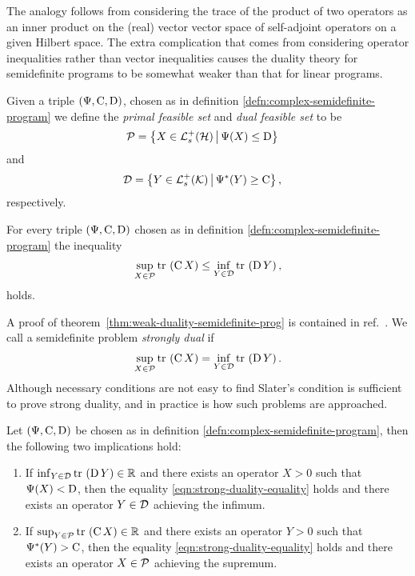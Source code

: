 The analogy follows from considering the trace of the product of two operators as an inner product on the (real) vector vector space of self-adjoint operators on a given Hilbert space. The extra complication that comes from considering operator inequalities rather than vector inequalities causes the duality theory for semidefinite programs to be somewhat weaker than that for linear programs.

\begin{defn}\label{defn:semidefinite-feasible-sets}
  Given a triple $\left(\Psi, \operatorname{C}, \operatorname{D}\right)$, chosen as in definition \ref{defn:complex-semidefinite-program} we define the \emph{primal feasible set} and \emph{dual feasible set} to be
  \begin{align}
    \pcal &= \sbuild{X\in\posops[\hcal]}{\Psi(X)\leq \opd}
  \end{align}
  and
  \begin{align}
    \dcal &= \sbuild{Y\in\posops[\kcal]}{\Psi^*(Y)\geq \opc},
  \end{align}
  respectively.
\end{defn}

\begin{thm}\label{thm:weak-duality-semidefinite-prog}
  For every triple $\left(\Psi, \operatorname{C}, \operatorname{D}\right)$ chosen as in definition \ref{defn:complex-semidefinite-program} the inequality
  \begin{align}
    \sup_{X\in\pcal} \tr{\opc X} \leq \inf_{Y\in\dcal} \tr{\opd Y},
  \end{align}
  holds.
\end{thm}
A proof of theorem~\ref{thm:weak-duality-semidefinite-prog} is contained in ref.~\cite{Vandenberghe-Boyd-semidefinite}.
We call a semidefinite problem \emph{strongly dual} if
\begin{align}\label{eqn:strong-duality-equality}
  \sup_{X\in\pcal} \tr{\opc X} = \inf_{Y\in\dcal} \tr{\opd Y}.
\end{align}
Although necessary conditions are not easy to find Slater's condition \cite{slater1950} is sufficient to prove strong duality, and in practice is how such problems are approached.
\begin{thm}\label{eqn:slaters-condition-sufficient}
  Let $\left(\Psi, \operatorname{C}, \operatorname{D}\right)$ be chosen as in definition \ref{defn:complex-semidefinite-program}, then the following two implications hold:
  \begin{enumerate}
  \item If $\inf_{Y\in\dcal} \tr{\opd Y} \in\R$ and there exists an operator $X> 0$ such that $\Psi(X) < \operatorname{D}$, then the equality \eqref{eqn:strong-duality-equality} holds and there exists an operator $Y\in\mathcal{D}$ achieving the infimum.
  \item If $\sup_{Y\in\pcal} \tr{\opc X} \in\R$ and there exists an operator $Y> 0$ such that $\Psi^*(Y) > \operatorname{C}$, then the equality \eqref{eqn:strong-duality-equality} holds and there exists an operator $X\in\mathcal{P}$ achieving the supremum.
  \end{enumerate}
\end{thm}

